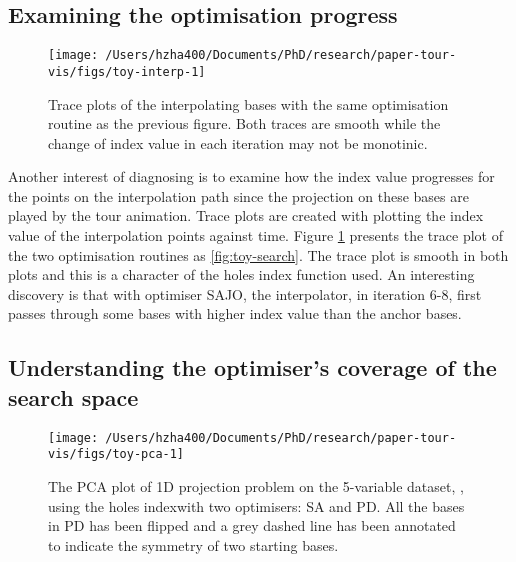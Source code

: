 \hypertarget{toy-interp}{%
\subsection{Examining the optimisation progress}\label{toy-interp}}

\begin{Schunk}
\begin{figure}
\texttt{[image: /Users/hzha400/Documents/PhD/research/paper-tour-vis/figs/toy-interp-1]} \caption[Trace plots of the interpolating bases with the same optimisation routine as the previous figure]{Trace plots of the interpolating bases with the same optimisation routine as the previous figure. Both traces are smooth while the change of index value in each iteration may not be monotinic.}\label{fig:toy-interp}
\end{figure}
\end{Schunk}

Another interest of diagnosing is to examine how the index value
progresses for the points on the interpolation path since the projection
on these bases are played by the tour animation. Trace plots are created
with plotting the index value of the interpolation points against time.
Figure \ref{fig:toy-interp} presents the trace plot of the two
optimisation routines as \ref{fig:toy-search}. The trace plot is smooth
in both plots and this is a character of the holes index function used.
An interesting discovery is that with optimiser SAJO, the interpolator,
in iteration 6-8, first passes through some bases with higher index
value than the anchor bases.

\hypertarget{toy-pca}{%
\subsection{Understanding the optimiser's coverage of the search
space}\label{toy-pca}}

\begin{Schunk}
\begin{figure}
\texttt{[image: /Users/hzha400/Documents/PhD/research/paper-tour-vis/figs/toy-pca-1]} \caption[The PCA plot of 1D projection problem on the 5-variable dataset, , using the holes indexwith two optimisers]{The PCA plot of 1D projection problem on the 5-variable dataset, , using the holes indexwith two optimisers: SA and PD. All the bases in PD has been flipped and a grey dashed line has been annotated to indicate the symmetry of two starting bases.}\label{fig:toy-pca}
\end{figure}
\end{Schunk}

